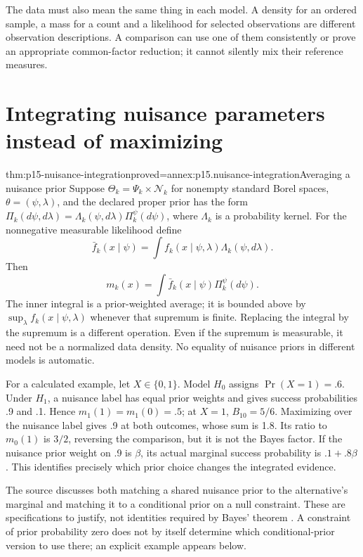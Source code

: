 The data must also mean the same thing in each model. A density for an
ordered sample, a mass for a count and a likelihood for selected observations
are different observation descriptions. A comparison can use one of them
consistently or prove an appropriate common-factor reduction; it cannot
silently mix their reference measures.

\section{Integrating nuisance parameters instead of maximizing}
\label{sec:p15-nuisance-model-integration}

\begin{hbtheorem}{thm:p15-nuisance-integration}{proved=annex:p15.nuisance-integration}{Averaging a nuisance prior}
Suppose \(\Theta_k=\Psi_k\times\mathcal N_k\) for nonempty standard
Borel spaces, \(\theta=(\psi,\lambda)\), and the declared proper prior has
the form
\(\Pi_k(d\psi,d\lambda)=\Lambda_k(\psi,d\lambda)\Pi_k^\psi(d\psi)\),
where \(\Lambda_k\) is a probability kernel. For the nonnegative measurable
likelihood define
\[
 \bar f_k(x\mid\psi)=\int f_k(x\mid\psi,\lambda)\Lambda_k(\psi,d\lambda).
\]
Then
\[
 m_k(x)=\int\bar f_k(x\mid\psi)\Pi_k^\psi(d\psi).
\]
The inner integral is a prior-weighted average; it is bounded above by
\(\sup_\lambda f_k(x\mid\psi,\lambda)\) whenever that supremum is finite.
Replacing the integral by the supremum is a different operation. Even if
the supremum is measurable, it need not be a normalized data density.
No equality of nuisance priors in different models is automatic.
\end{hbtheorem}

For a calculated example, let \(X\in\{0,1\}\). Model \(H_0\) assigns
\(\Pr(X=1)=.6\). Under \(H_1\), a nuisance label has equal prior weights
and gives success probabilities .9 and .1. Hence \(m_1(1)=m_1(0)=.5\);
at \(X=1\), \(B_{10}=5/6\). Maximizing over the nuisance label gives
.9 at both outcomes, whose sum is 1.8. Its ratio to \(m_0(1)\) is
\(3/2\), reversing the comparison, but it is not the Bayes factor.
If the nuisance prior weight on .9 is \(\beta\), its actual marginal
success probability is \(.1+.8\beta\). This identifies precisely which
prior choice changes the integrated evidence.

The source discusses both matching a shared nuisance prior to the
alternative's marginal and matching it to a conditional prior on a null
constraint. These are specifications to justify, not identities required
by Bayes' theorem \cite[Sec.~5.1, eq.~(13)]{KassRaftery1995BayesFactors}.
A constraint of prior probability zero does not by itself determine which
conditional-prior version to use there; an explicit example appears below.

